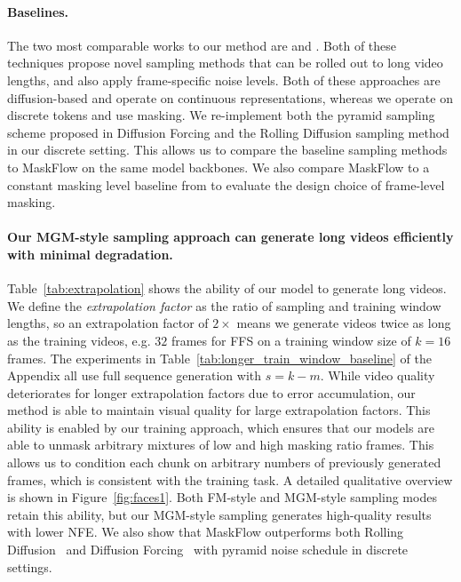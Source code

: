 \paragraph{Baselines.}
The two most comparable works to our method are \citet{chen2024diffusionforcing} and \citet{ruhe2024rollingdiffusionmodels}. Both of these techniques propose novel sampling methods that can be rolled out to long video lengths, and also apply frame-specific noise levels. Both of these approaches are diffusion-based and operate on continuous representations, whereas we operate on discrete tokens and use masking. We re-implement both the pyramid sampling scheme proposed in Diffusion Forcing and the Rolling Diffusion sampling method in our discrete setting. This allows us to compare the baseline sampling methods to MaskFlow on the same model backbones. We also compare MaskFlow to a constant masking level baseline from \citet{hu2024maskneed} to evaluate the design choice of frame-level masking.

\paragraph{Our MGM-style sampling approach can generate long videos efficiently with minimal degradation.} 
Table~\ref{tab:extrapolation} shows the ability of our model to generate long videos. We define the \emph{extrapolation factor} as the ratio of sampling and training window lengths, so an extrapolation factor of $2 \times$ means we generate videos twice as long as the training videos, e.g. $32$ frames for FFS on a training window size of $k=16$ frames. The experiments in Table~\ref{tab:longer_train_window_baseline} of the Appendix all use full sequence generation with $s = k - m$. While video quality deteriorates for longer extrapolation factors due to error accumulation, our method is able to maintain visual quality for large extrapolation factors. This ability is enabled by our training approach, which ensures that our models are able to unmask arbitrary mixtures of low and high masking ratio frames. This allows us to condition each chunk on arbitrary numbers of previously generated frames, which is consistent with the training task. A detailed qualitative overview is shown in Figure~\ref{fig:faces1}. Both FM-style and MGM-style sampling modes retain this ability, but our MGM-style sampling generates high-quality results with lower NFE. We also show that MaskFlow outperforms both Rolling Diffusion~\cite{ruhe2024rollingdiffusionmodels} and Diffusion Forcing~\cite{chen2024diffusionforcing} with pyramid noise schedule in discrete settings.

